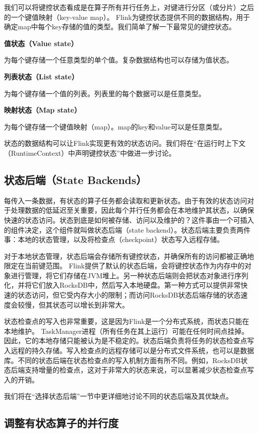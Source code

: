 \documentclass[oneside]{ctexbook}
\begin{document}
我们可以将键控状态看成是在算子所有并行任务上，对键进行分区（或分片）之后的一个键值映射（key-value map）。 Flink为键控状态提供不同的数据结构，用于确定map中每个key存储的值的类型。我们简单了解一下最常见的键控状态。

\textbf{值状态（Value state）}

为每个键存储一个任意类型的单个值。复杂数据结构也可以存储为值状态。

\textbf{列表状态（List state）}

为每个键存储一个值的列表。列表里的每个数据可以是任意类型。

\textbf{映射状态（Map state）}

为每个键存储一个键值映射（map）。map的key和value可以是任意类型。

状态的数据结构可以让Flink实现更有效的状态访问。我们将在“在运行时上下文（RuntimeContext）中声明键控状态”中做进一步讨论。

\subsection{状态后端（State Backends）}

每传入一条数据，有状态的算子任务都会读取和更新状态。由于有效的状态访问对于处理数据的低延迟至关重要，因此每个并行任务都会在本地维护其状态，以确保快速的状态访问。状态到底是如何被存储、访问以及维护的？这件事由一个可插入的组件决定，这个组件就叫做状态后端（state backend）。状态后端主要负责两件事：本地的状态管理，以及将检查点（checkpoint）状态写入远程存储。

对于本地状态管理，状态后端会存储所有键控状态，并确保所有的访问都被正确地限定在当前键范围。 Flink提供了默认的状态后端，会将键控状态作为内存中的对象进行管理，将它们存储在JVM堆上。另一种状态后端则会把状态对象进行序列化，并将它们放入RocksDB中，然后写入本地硬盘。第一种方式可以提供非常快速的状态访问，但它受内存大小的限制；而访问RocksDB状态后端存储的状态速度会较慢，但其状态可以增长到非常大。

状态检查点的写入也非常重要，这是因为Flink是一个分布式系统，而状态只能在本地维护。 TaskManager进程（所有任务在其上运行）可能在任何时间点挂掉。因此，它的本地存储只能被认为是不稳定的。状态后端负责将任务的状态检查点写入远程的持久存储。写入检查点的远程存储可以是分布式文件系统，也可以是数据库。不同的状态后端在状态检查点的写入机制方面有所不同。例如，RocksDB状态后端支持增量的检查点，这对于非常大的状态来说，可以显著减少状态检查点写入的开销。

我们将在“选择状态后端”一节中更详细地讨论不同的状态后端及其优缺点。

\subsection{调整有状态算子的并行度}
\end{document}
